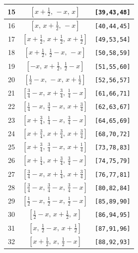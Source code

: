 \documentclass[fleqn,8pt]{jsarticle}
\begin{document}
\begin{longtable}{ccc}
15 & $\left[ x + \frac{1}{2},\, - x,\, x \right]$ & {\tt [39,43,48]} \\ \hline
16 & $\left[ x,\, x + \frac{1}{2},\, - x \right]$ & {\tt [40,44,45]} \\ \hline
17 & $\left[ x + \frac{1}{2},\, x + \frac{1}{2},\, x + \frac{1}{2} \right]$ & {\tt [49,53,54]} \\ \hline
18 & $\left[ x + \frac{1}{2},\, \frac{1}{2} - x,\, - x \right]$ & {\tt [50,58,59]} \\ \hline
19 & $\left[ - x,\, x + \frac{1}{2},\, \frac{1}{2} - x \right]$ & {\tt [51,55,60]} \\ \hline
20 & $\left[ \frac{1}{2} - x,\, - x,\, x + \frac{1}{2} \right]$ & {\tt [52,56,57]} \\ \hline
21 & $\left[ \frac{3}{4} - x,\, x + \frac{3}{4},\, \frac{1}{4} - x \right]$ & {\tt [61,66,71]} \\ \hline
22 & $\left[ \frac{1}{4} - x,\, \frac{3}{4} - x,\, x + \frac{3}{4} \right]$ & {\tt [62,63,67]} \\ \hline
23 & $\left[ x + \frac{3}{4},\, \frac{1}{4} - x,\, \frac{3}{4} - x \right]$ & {\tt [64,65,69]} \\ \hline
24 & $\left[ x + \frac{3}{4},\, x + \frac{3}{4},\, x + \frac{3}{4} \right]$ & {\tt [68,70,72]} \\ \hline
25 & $\left[ x + \frac{3}{4},\, \frac{3}{4} - x,\, x + \frac{1}{4} \right]$ & {\tt [73,78,83]} \\ \hline
26 & $\left[ x + \frac{1}{4},\, x + \frac{3}{4},\, \frac{3}{4} - x \right]$ & {\tt [74,75,79]} \\ \hline
27 & $\left[ \frac{3}{4} - x,\, x + \frac{1}{4},\, x + \frac{3}{4} \right]$ & {\tt [76,77,81]} \\ \hline
28 & $\left[ \frac{3}{4} - x,\, \frac{3}{4} - x,\, \frac{3}{4} - x \right]$ & {\tt [80,82,84]} \\ \hline
29 & $\left[ \frac{1}{2} - x,\, \frac{1}{2} - x,\, \frac{1}{2} - x \right]$ & {\tt [85,89,90]} \\ \hline
30 & $\left[ \frac{1}{2} - x,\, x + \frac{1}{2},\, x \right]$ & {\tt [86,94,95]} \\ \hline
31 & $\left[ x,\, \frac{1}{2} - x,\, x + \frac{1}{2} \right]$ & {\tt [87,91,96]} \\ \hline
32 & $\left[ x + \frac{1}{2},\, x,\, \frac{1}{2} - x \right]$ & {\tt [88,92,93]} \\
\end{longtable}
\renewcommand{\arraystretch}{1.2}
\end{document}
